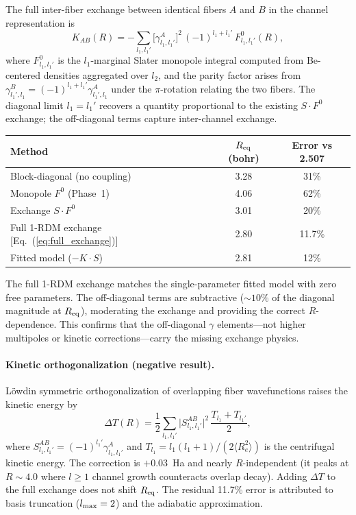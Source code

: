 \documentclass[aps,pra,twocolumn,superscriptaddress,longbibliography,floatfix]{revtex4-2}
\begin{document}
The full inter-fiber exchange between identical fibers $A$ and $B$
in the channel representation is
\begin{equation}
  K_{AB}(R) = -\sum_{l_1, l_1'}
    \bigl[\gamma^A_{l_1, l_1'}\bigr]^2\,
    (-1)^{l_1 + l_1'}\,
    F^0_{l_1, l_1'}(R),
  \label{eq:full_exchange}
\end{equation}
where $F^0_{l_1, l_1'}$ is the $l_1$-marginal Slater monopole
integral computed from Be-centered densities aggregated over $l_2$,
and the parity factor arises from $\gamma^B_{l_1', l_1}
= (-1)^{l_1 + l_1'} \gamma^A_{l_1', l_1}$ under the $\pi$-rotation
relating the two fibers.  The diagonal limit $l_1 = l_1'$ recovers a
quantity proportional to the existing $S \cdot F^0$ exchange; the
off-diagonal terms capture inter-channel exchange.

\begin{center}
\begin{tabular}{lcc}
\hline
Method & $R_{\rm eq}$ (bohr) & Error vs 2.507 \\
\hline
Block-diagonal (no coupling) & 3.28 & 31\% \\
Monopole $F^0$ (Phase~1)     & 4.06 & 62\% \\
Exchange $S \cdot F^0$       & 3.01 & 20\% \\
Full 1-RDM exchange [Eq.~(\ref{eq:full_exchange})] & 2.80 & 11.7\% \\
Fitted model ($-K \cdot S$)  & 2.81 & 12\% \\
\hline
\end{tabular}
\end{center}

The full 1-RDM exchange matches the single-parameter fitted model
with zero free parameters.  The off-diagonal terms are subtractive
(${\sim}10\%$ of the diagonal magnitude at $R_{\rm eq}$),
moderating the exchange and providing the correct $R$-dependence.
This confirms that the off-diagonal $\gamma$ elements---not
higher multipoles or kinetic corrections---carry the missing
exchange physics.

\paragraph{Kinetic orthogonalization (negative result).}
L\"{o}wdin symmetric orthogonalization of overlapping fiber
wavefunctions raises the kinetic energy by
\begin{equation}
  \Delta T(R) = \frac{1}{2} \sum_{l_1, l_1'}
    \bigl|S^{AB}_{l_1, l_1'}\bigr|^2\,
    \frac{T_{l_1} + T_{l_1'}}{2},
\end{equation}
where $S^{AB}_{l_1, l_1'} = (-1)^{l_1'} \gamma^A_{l_1, l_1'}$
and $T_{l_1} = l_1(l_1+1)/(2\langle R_e^2 \rangle)$ is the
centrifugal kinetic energy.  The correction is $+0.03$~Ha and
nearly $R$-independent (it peaks at $R \sim 4.0$ where $l \ge 1$
channel growth counteracts overlap decay).  Adding $\Delta T$ to
the full exchange does not shift $R_{\rm eq}$.  The residual
11.7\% error is attributed to basis truncation ($l_{\rm max} = 2$)
and the adiabatic approximation.
\end{document}
